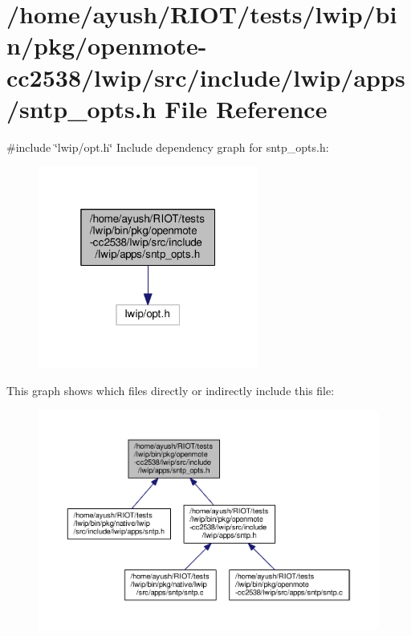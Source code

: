 \hypertarget{openmote-cc2538_2lwip_2src_2include_2lwip_2apps_2sntp__opts_8h}{}\section{/home/ayush/\+R\+I\+O\+T/tests/lwip/bin/pkg/openmote-\/cc2538/lwip/src/include/lwip/apps/sntp\+\_\+opts.h File Reference}
\label{openmote-cc2538_2lwip_2src_2include_2lwip_2apps_2sntp__opts_8h}
{\ttfamily \#include \char`\"{}lwip/opt.\+h\char`\"{}}\newline
Include dependency graph for sntp\+\_\+opts.\+h\+:
\nopagebreak
\begin{figure}[H]
\begin{center}
\leavevmode
\includegraphics[width=205pt]{openmote-cc2538_2lwip_2src_2include_2lwip_2apps_2sntp__opts_8h__incl}
\end{center}
\end{figure}
This graph shows which files directly or indirectly include this file\+:
\nopagebreak
\begin{figure}[H]
\begin{center}
\leavevmode
\includegraphics[width=350pt]{openmote-cc2538_2lwip_2src_2include_2lwip_2apps_2sntp__opts_8h__dep__incl}
\end{center}
\end{figure}
